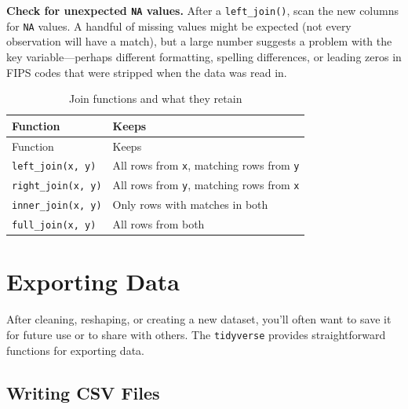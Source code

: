 \documentclass[
  letterpaper,
  DIV=11,
  numbers=noendperiod]{scrreprt}
\begin{document}
\textbf{Check for unexpected \texttt{NA} values.} After a
\texttt{left\_join()}, scan the new columns for \texttt{NA} values. A
handful of missing values might be expected (not every observation will
have a match), but a large number suggests a problem with the key
variable---perhaps different formatting, spelling differences, or
leading zeros in FIPS codes that were stripped when the data was read
in.

\begin{tcolorbox}[enhanced jigsaw, arc=.35mm, bottomrule=.15mm, bottomtitle=1mm, breakable, colback=white, colbacktitle=quarto-callout-tip-color!10!white, colframe=quarto-callout-tip-color-frame, coltitle=black, left=2mm, leftrule=.75mm, opacityback=0, opacitybacktitle=0.6, rightrule=.15mm, title=\textcolor{quarto-callout-tip-color}{\faLightbulb}\hspace{0.5em}{Join Quick Reference}, titlerule=0mm, toprule=.15mm, toptitle=1mm]

\begin{longtable}[]{@{}ll@{}}
\caption{Join functions and what they
retain}\label{tbl-join-functions}\tabularnewline
\toprule\noalign{}
Function & Keeps \\
\midrule\noalign{}
\endfirsthead
\toprule\noalign{}
Function & Keeps \\
\midrule\noalign{}
\endhead
\bottomrule\noalign{}
\endlastfoot
\texttt{left\_join(x,\ y)} & All rows from \texttt{x}, matching rows
from \texttt{y} \\
\texttt{right\_join(x,\ y)} & All rows from \texttt{y}, matching rows
from \texttt{x} \\
\texttt{inner\_join(x,\ y)} & Only rows with matches in both \\
\texttt{full\_join(x,\ y)} & All rows from both \\
\end{longtable}

\end{tcolorbox}

\section{Exporting Data}\label{exporting-data}

After cleaning, reshaping, or creating a new dataset, you'll often want
to save it for future use or to share with others. The
\texttt{tidyverse} provides straightforward functions for exporting
data.

\subsection{Writing CSV Files}\label{writing-csv-files}
\end{document}

